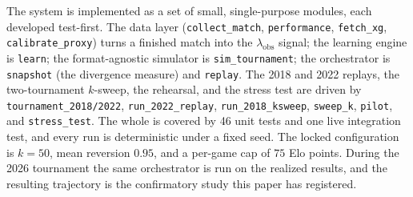 \documentclass[11pt,letterpaper]{article}
\begin{document}
The system is implemented as a set of small, single-purpose modules, each developed test-first. The data layer (\texttt{collect\_match}, \texttt{performance}, \texttt{fetch\_xg}, \texttt{calibrate\_proxy}) turns a finished match into the $\lambda_{\text{obs}}$ signal; the learning engine is \texttt{learn}; the format-agnostic simulator is \texttt{sim\_tournament}; the orchestrator is \texttt{snapshot} (the divergence measure) and \texttt{replay}. The 2018 and 2022 replays, the two-tournament $k$-sweep, the rehearsal, and the stress test are driven by \texttt{tournament\_2018/2022}, \texttt{run\_2022\_replay}, \texttt{run\_2018\_ksweep}, \texttt{sweep\_k}, \texttt{pilot}, and \texttt{stress\_test}. The whole is covered by 46 unit tests and one live integration test, and every run is deterministic under a fixed seed. The locked configuration is $k=50$, mean reversion $0.95$, and a per-game cap of $75$ Elo points. During the 2026 tournament the same orchestrator is run on the realized results, and the resulting trajectory is the confirmatory study this paper has registered.
\end{document}
